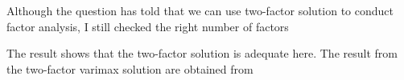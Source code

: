 \documentclass[
]{article}
\newenvironment{Shaded}{\begin{snugshade}}{\end{snugshade}}
\newcommand{\AttributeTok}[1]{\textcolor[rgb]{0.77,0.63,0.00}{#1}}
\newcommand{\CommentTok}[1]{\textcolor[rgb]{0.56,0.35,0.01}{\textit{#1}}}
\newcommand{\ControlFlowTok}[1]{\textcolor[rgb]{0.13,0.29,0.53}{\textbf{#1}}}
\newcommand{\DecValTok}[1]{\textcolor[rgb]{0.00,0.00,0.81}{#1}}
\newcommand{\ErrorTok}[1]{\textcolor[rgb]{0.64,0.00,0.00}{\textbf{#1}}}
\newcommand{\FloatTok}[1]{\textcolor[rgb]{0.00,0.00,0.81}{#1}}
\newcommand{\FunctionTok}[1]{\textcolor[rgb]{0.00,0.00,0.00}{#1}}
\newcommand{\NormalTok}[1]{#1}
\newcommand{\SpecialCharTok}[1]{\textcolor[rgb]{0.00,0.00,0.00}{#1}}
\newcommand{\StringTok}[1]{\textcolor[rgb]{0.31,0.60,0.02}{#1}}
\begin{document}
Although the question has told that we can use two-factor solution to
conduct factor analysis, I still checked the right number of factors

\begin{Shaded}
\end{Shaded}

The result shows that the two-factor solution is adequate here. The
result from the two-factor varimax solution are obtained from
\end{document}
